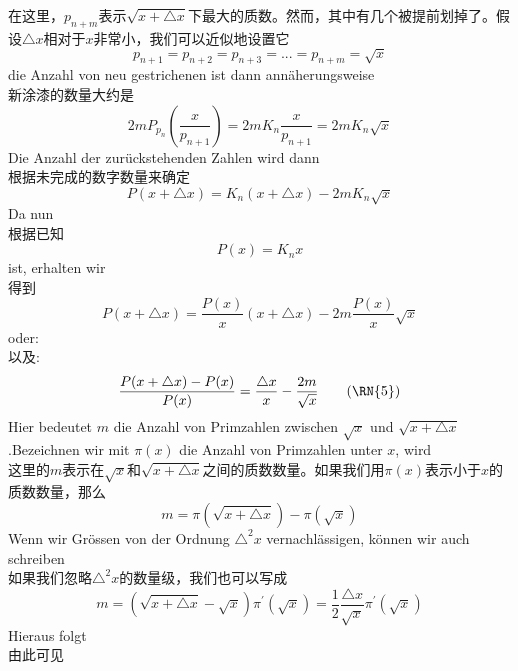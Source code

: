 \documentclass[UTF8,a4paper,zihao=-4]{article}
\begin{document}
\indent 在这里，$p_{n+m}$表示$\sqrt{x+\triangle x}$下最大的质数。然而，其中有几个被提前划掉了。假设$\triangle x$相对于$x$非常小，我们可以近似地设置它
$$
p_{n+1}=p_{n+2}=p_{n+3}=...=p_{n+m}=\sqrt{x}
$$
die Anzahl von neu gestrichenen ist dann annäherungsweise\\
新涂漆的数量大约是
$$
2mP_{p_n}(\frac{x}{p_{n+1}})=2mK_n\frac{x}{p_{n+1}}=2mK_n\sqrt{x}
$$
\indent Die Anzahl der zurückstehenden Zahlen wird dann\\
\indent 根据未完成的数字数量来确定
$$
P(x+\triangle x)=K_n(x+\triangle x)-2mK_n\sqrt{x}
$$
\indent Da nun\\
\indent 根据已知
$$
P(x)=K_nx
$$
ist, erhalten wir\\
得到
$$
P(x+\triangle x)=\frac{P(x)}{x}(x+\triangle x)-2m\frac{P(x)}{x}\sqrt{x}
$$
oder:\\
以及:
\begin{align}
\frac{P(x+\triangle x)-P(x)}{P(x)}=\frac{\triangle x}{x}-\frac{2m}{\sqrt{x}}\tag{\RN{5}}
\end{align}
Hier bedeutet $m$ die Anzahl von Primzahlen zwischen $\sqrt{x}$ und $\sqrt{x+\triangle x}$.Bezeichnen wir mit $\pi(x)$ die Anzahl von Primzahlen unter $x$, wird\\
这里的$m$表示在$\sqrt{x}$和$\sqrt{x+\triangle x}$之间的质数数量。如果我们用$\pi(x)$表示小于$x$的质数数量，那么
$$
m=\pi(\sqrt{x+\triangle x})-\pi(\sqrt{x})
$$
Wenn wir Grössen von der Ordnung $\triangle^2x$ vernachlässigen, können wir auch schreiben\\
如果我们忽略$\triangle^2x$的数量级，我们也可以写成
$$
m=(\sqrt{x+\triangle x}-\sqrt{x})\pi^{\prime}(\sqrt{x})=\frac{1}{2}\frac{\triangle x}{\sqrt{x}}\pi^{\prime}(\sqrt{x})
$$
Hieraus folgt\\
由此可见
\end{document}
